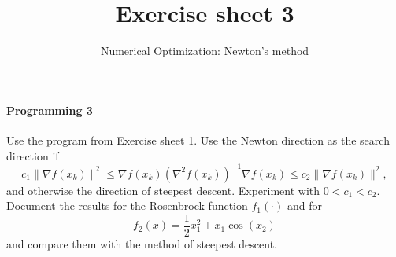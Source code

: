 
\title{Exercise sheet 3}
\subtitle{Numerical Optimization: Newton's method}
\usepackage{amsmath}
\newcommand\tp{\ensuremath{\text{\upshape T}}}

\maketitle

\paragraph{Programming 3}
Use the program from Exercise sheet 1. Use the Newton direction as the search
direction if
\[
c_1 \|\nabla f(x_k)\|^2
\le \nabla f(x_k)(\nabla^2 f(x_k))^{-1} \nabla f(x_k)
\le c_2 \|\nabla f(x_k)\|^2,
\]
and otherwise the direction of steepest descent. Experiment with $0<c_1<c_2$.
Document the results for the Rosenbrock function $f_1(\cdot)$ and for
\[
f_2(x) = \frac{1}{2}x_1^2 + x_1\cos(x_2)
\]
and compare them with the method of steepest descent.


